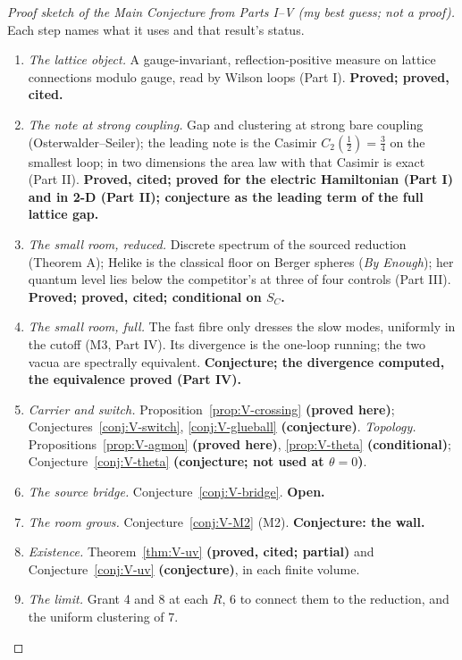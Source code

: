 \begin{proof}[Proof sketch of the Main Conjecture from Parts I--V \textmd{(my best guess; not a proof)}]
Each step names what it uses and that result's status.
\begin{enumerate}[leftmargin=18pt,itemsep=2pt,topsep=2pt]
\item \emph{The lattice object.} A gauge-invariant, reflection-positive measure on lattice connections modulo
gauge, read by Wilson loops (Part I). \textbf{Proved; proved, cited.}
\item \emph{The note at strong coupling.} Gap and clustering at strong bare coupling (Osterwalder--Seiler); the
leading note is the Casimir $C_2(\frac12)=\frac34$ on the smallest loop; in two dimensions the area law with that
Casimir is exact (Part II). \textbf{Proved, cited; proved for the electric Hamiltonian (Part I) and in 2-D (Part II);
conjecture as the leading term of the full lattice gap.}
\item \emph{The small room, reduced.} Discrete spectrum of the sourced reduction (Theorem A); Helike is the classical
floor on Berger spheres (\emph{By Enough}); her quantum level lies below the competitor's at three of four controls
(Part III). \textbf{Proved; proved, cited; conditional on $S_C$.}
\item \emph{The small room, full.} The fast fibre only dresses the slow modes, uniformly in the cutoff (M3, Part IV).
Its divergence is the one-loop running; the two vacua are spectrally equivalent. \textbf{Conjecture; the divergence
computed, the equivalence proved (Part IV).}
\item \emph{Carrier and switch.} Proposition~\ref{prop:V-crossing} \textbf{(proved here)};
Conjectures~\ref{conj:V-switch}, \ref{conj:V-glueball} \textbf{(conjecture)}. \emph{Topology.}
Propositions~\ref{prop:V-agmon} \textbf{(proved here)}, \ref{prop:V-theta} \textbf{(conditional)};
Conjecture~\ref{conj:V-theta} \textbf{(conjecture; not used at $\theta=0$)}.
\item \emph{The source bridge.} Conjecture~\ref{conj:V-bridge}. \textbf{Open.}
\item \emph{The room grows.} Conjecture~\ref{conj:V-M2} (M2). \textbf{Conjecture: the wall.}
\item \emph{Existence.} Theorem~\ref{thm:V-uv} \textbf{(proved, cited; partial)} and Conjecture~\ref{conj:V-uv}
\textbf{(conjecture)}, in each finite volume.
\item \emph{The limit.} Grant 4 and 8 at each $R$, 6 to connect them to the reduction, and the uniform clustering of 7.

\end{enumerate}
\end{proof}
